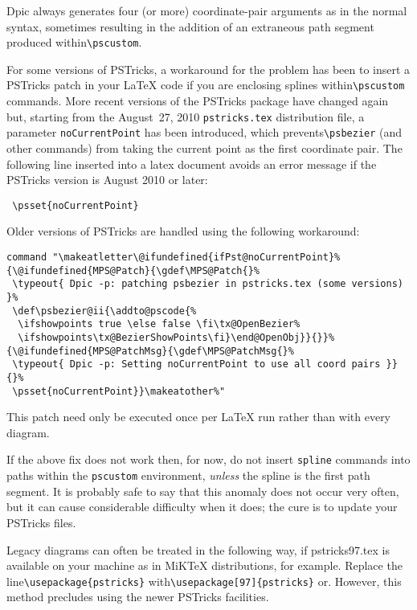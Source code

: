 \documentclass[11pt]{article}
\newcommand{\bq}{}
\newcommand{\PSTricks}{{\bq PSTricks}\xspace}
\newcommand{\tBS}{{\tt\char92}}
\begin{document}
  Dpic always generates four (or
  more) coordinate-pair arguments as in the normal syntax, sometimes
  resulting in the addition of an extraneous path segment produced
  within\verb|\pscustom|.

  For some versions of \PSTricks,
  a workaround for the problem has been to insert a
  \PSTricks patch in your LaTeX code if you are enclosing splines
  within\verb|\pscustom| commands.
  More recent versions of the \PSTricks package have changed
  again but, starting from the
  August~27, 2010 {\tt pstricks.tex} distribution file, a parameter
  {\tt noCurrentPoint} has been introduced,
  which prevents\verb|\psbezier| (and other commands)
  from taking the current point as the first coordinate pair.
  The following line inserted into a latex document avoids an
  error message if the \PSTricks version is August 2010 or later:
\begin{verbatim}
 \psset{noCurrentPoint}
\end{verbatim}
  Older versions of \PSTricks are handled using the following workaround:
\begin{verbatim}
command "\makeatletter\@ifundefined{ifPst@noCurrentPoint}%
{\@ifundefined{MPS@Patch}{\gdef\MPS@Patch{}%
 \typeout{ Dpic -p: patching psbezier in pstricks.tex (some versions) }%
 \def\psbezier@ii{\addto@pscode{%
  \ifshowpoints true \else false \fi\tx@OpenBezier%
  \ifshowpoints\tx@BezierShowPoints\fi}\end@OpenObj}}{}}%
{\@ifundefined{MPS@PatchMsg}{\gdef\MPS@PatchMsg{}%
 \typeout{ Dpic -p: Setting noCurrentPoint to use all coord pairs }}{}%
 \psset{noCurrentPoint}}\makeatother%"
\end{verbatim}

  This patch need only be executed once per LaTeX run rather than with
  every diagram.

  If the above fix does not work then, for now,
  do not insert {\tt spline} commands into paths within the {\tt \tBS pscustom}
  environment, {\em unless} the spline is the first path segment. It is probably
  safe to say that this anomaly does not occur very often, but it
  can cause considerable difficulty when it does; the cure is to update your
  \PSTricks files.

  Legacy diagrams can often be treated in the following way, if pstricks97.tex
  is available on your machine as in MiKTeX distributions, for example.
  Replace the line\verb|\usepackage{pstricks}|
  with\verb|\usepackage[97]{pstricks}| or\verb||.
  However, this method precludes using the newer \PSTricks facilities.
\end{document}
